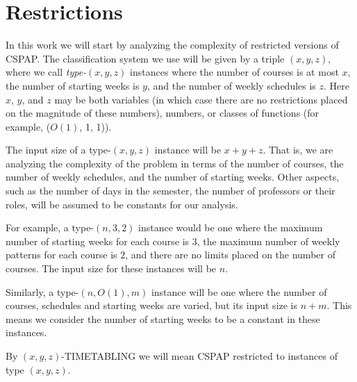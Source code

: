 \section{Restrictions}

In this work we will start by analyzing the complexity of restricted versions of CSPAP. The classification system we use will be given by a triple $(x, y, z)$, where we call \emph{type-}$(x, y, z)$ instances where the number of courses is at most $x$, the number of starting weeks is $y$, and the number of weekly schedules is $z$. Here $x$, $y$, and $z$ may be both variables (in which case there are no restrictions placed on the magnitude of these numbers), numbers, or classes of functions (for example, ($O(1)$, 1, 1)).

The input size of a type-$(x, y, z)$ instance will be $x + y + z$. That is, we are analyzing the complexity of the problem in terms of the number of courses, the number of weekly schedules, and the number of starting weeks. Other aspects, such as the number of days in the semester, the number of professors or their roles, will be assumed to be constants for our analysis.

For example, a type-$(n, 3, 2)$ instance would be one where the maximum number of starting weeks for each course is $3$, the maximum number of weekly patterns for each course is $2$, and there are no limits placed on the number of courses. The input size for these instances will be $n$.

Similarly, a type-$(n, O(1), m)$ instance will be one where the number of courses, schedules and starting weeks are varied, but its input size is $n + m$. This means we consider the number of starting weeks to be a constant in these instances.

By $(x, y, z)$-TIMETABLING we will mean CSPAP restricted to instances of type $(x, y, z)$.

